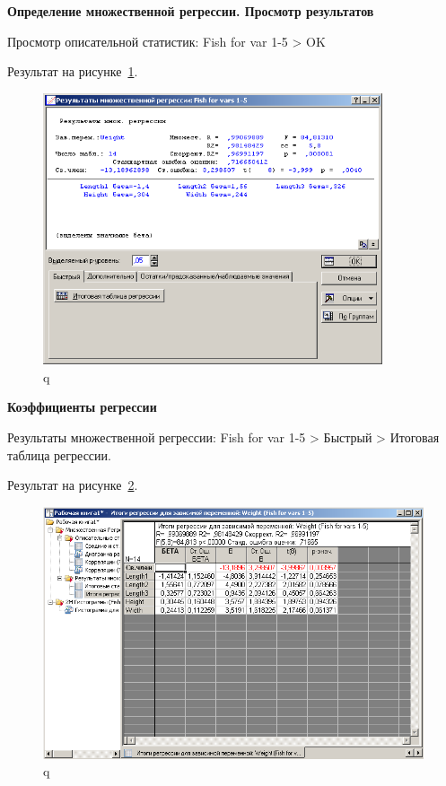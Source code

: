 \newpage

\begin{center}
  \textbf{Определение множественной регрессии. Просмотр результатов}
\end{center}

Просмотр описательной статистик: Fish for var 1-5 > OK

Результат на рисунке~\ref{fig:var5__20}.

\begin{figure}[!h]
  \centering

  \includegraphics[height=8cm]
  {inc/var5__20.PNG}

  \caption{q}

  \label{fig:var5__20}
\end{figure}

\newpage

\begin{center}
  \textbf{Коэффициенты регрессии}
\end{center}

Результаты множественной регрессии: Fish for var 1-5 > Быстрый > Итоговая таблица регрессии.

Результат на рисунке~\ref{fig:var5__21}.

\begin{figure}[!h]
  \centering

  \includegraphics[width=12cm]
  {inc/var5__21.PNG}

  \caption{q}

  \label{fig:var5__21}
\end{figure}

